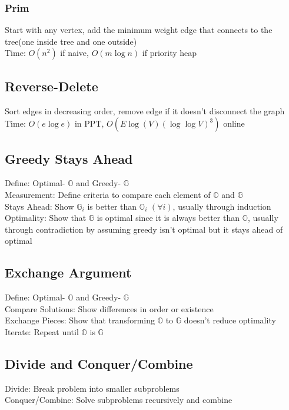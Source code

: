 \documentclass{article}
\begin{document}
\begin{multicols*}{2}
        \subsubsection*{Prim}
        Start with any vertex, add the minimum weight edge that connects to the tree(one inside
        tree and one outside)\\
        Time: $O(n^2)$ if naive, $O(m\log n)$ if priority heap
        \subsection*{Reverse-Delete}
        Sort edges in decreasing order, remove edge if it doesn't disconnect the graph\\
        Time: $O(e\log e)$ in PPT, $O(E\log(V)(\log\log V)^3)$ online
        \subsection*{Greedy Stays Ahead}
        Define: Optimal- $\mathbb{O}$ and Greedy- $\mathbb{G}$\\
        Measurement: Define criteria to compare each element of $\mathbb{O}$ and $\mathbb{G}$\\
        Stays Ahead: Show $\mathbb{G}_i$ is better than $\mathbb{O}_i$ $(\forall i)$, usually
        through induction\\
        Optimality: Show that $\mathbb{G}$ is optimal since it is always better than $\mathbb{O}$,
        usually through contradiction by assuming greedy isn't optimal but it stays ahead of optimal
        \subsection*{Exchange Argument}
        Define: Optimal- $\mathbb{O}$ and Greedy- $\mathbb{G}$\\
        Compare Solutions: Show differences in order or existence\\
        Exchange Pieces: Show that transforming $\mathbb{O}$ to $\mathbb{G}$ doesn't reduce
        optimality\\
        Iterate: Repeat until $\mathbb{O}$ is $\mathbb{G}$
        \subsection*{Divide and Conquer/Combine}
        Divide: Break problem into smaller subproblems\\
        Conquer/Combine: Solve subproblems recursively and combine

\end{multicols*}
\end{document}
